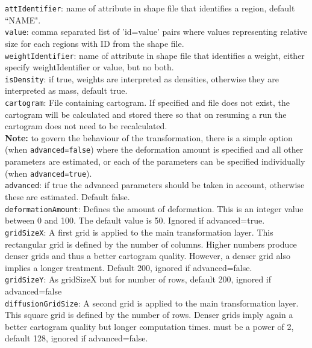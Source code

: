 \documentclass{article}
\begin{document}
{\tt attIdentifier}: name of attribute in shape file that identifies a region, default ``NAME".\\

{\tt value}: comma separated list of 'id=value' pairs where values representing relative size for each regions with ID from the shape file.\\

{\tt weightIdentifier}: name of attribute in shape file that identifies a weight, either specify weightIdentifier or value, but no both.\\

{\tt isDensity}: if true, weights are interpreted as densities, otherwise they are interpreted as mass, default true.\\

{\tt cartogram}: File containing cartogram. If specified and file does not exist, the cartogram will be calculated and stored there so that on resuming a run the cartogram does not need to be recalculated.\\

{\bf Note:} to govern the behaviour of the transformation, there is a simple option (when {\tt advanced=false}) where the deformation amount is specified and all other parameters are estimated, or each of the parameters can be specified individually (when {\tt advanced=true}).\\

{\tt advanced}: if true the advanced parameters should be taken in account, otherwise these are estimated. Default false.\\

{\tt deformationAmount}: Defines the amount of deformation. This is an integer value between 0 and 100. The default value is 50. Ignored if advanced=true.\\

{\tt gridSizeX}: A first grid is applied to the main transformation layer. 
This rectangular grid is defined by the number of columns. 
Higher numbers produce denser grids and thus a better cartogram quality. 
However, a denser grid also implies a longer treatment. 
Default 200, ignored if advanced=false.\\

{\tt gridSizeY}: As gridSizeX but for number of rows, default 200, ignored if advanced=false\\

{\tt diffusionGridSize}: A second grid is applied to the main transformation layer. 
This square grid is defined by the number of rows. 
Denser grids imply again a better cartogram quality but longer computation times.
must be a power of 2, default 128, ignored if advanced=false.\\
\end{document}
